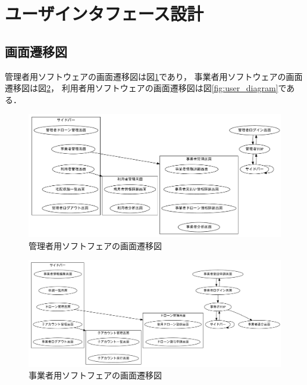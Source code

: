 \documentclass[a4paper, titlepage]{jsarticle}
\begin{document}
\section{ユーザインタフェース設計}
\subsection{画面遷移図}
管理者用ソフトウェアの画面遷移図は図\ref{fig:admin_diagram}であり，
事業者用ソフトウェアの画面遷移図は図\ref{fig:coop_diagram}，
利用者用ソフトウェアの画面遷移図は図\ref{fig:user_diagram}である．

\begin{figure}[H]
  \centering
  \includegraphics[width=\linewidth]{other/admin.pdf}
  \caption{管理者用ソフトフェアの画面遷移図}
  \label{fig:admin_diagram}
\end{figure}

\begin{figure}[H]
  \centering
  \includegraphics[width=\linewidth]{other/coop.pdf}
  \caption{事業者用ソフトフェアの画面遷移図}
  \label{fig:coop_diagram}
\end{figure}
\end{document}
